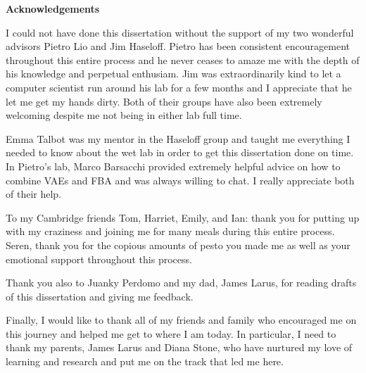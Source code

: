 \newpage
{\Huge \bf Acknowledgements}
\vspace{24pt} 

I could not have done this dissertation without the support of my two wonderful advisors Pietro Lio and Jim Haseloff.
Pietro has been consistent encouragement throughout this entire process and he never ceases to amaze me with the depth of his knowledge and perpetual enthusiam.
Jim was extraordinarily kind to let a computer scientist run around his lab for a few months and I appreciate that he let me get my hands dirty.
Both of their groups have also been extremely welcoming despite me not being in either lab full time.

Emma Talbot was my mentor in the Haseloff group and taught me everything I needed to know about the wet lab in order to get this dissertation done on time.
In Pietro's lab, Marco Barsacchi provided extremely helpful advice on how to combine VAEs and FBA and was always willing to chat.
I really appreciate both of their help.

To my Cambridge friends Tom, Harriet, Emily, and Ian: thank you for putting up with my craziness and joining me for many meals during this entire process.
Seren, thank you for the copious amounts of pesto you made me as well as your emotional support throughout this process.

Thank you also to Juanky Perdomo and my dad, James Larus, for reading drafts of this dissertation and giving me feedback.

Finally, I would like to thank all of my friends and family who encouraged me on this journey and helped me get to where I am today.
In particular, I need to thank my parents, James Larus and Diana Stone, who have nurtured my love of learning and research and put me on the track that led me here. 

\newpage
\vspace*{\fill}
